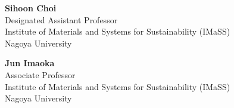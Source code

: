 \begin{titlepage}
\begin{center}
        \vspace{1.2cm} %

        \begin{minipage}[t]{0.45\textwidth}
            \centering
            \footnotesize
            \textbf{Sihoon Choi}\\
            Designated Assistant Professor \\
            Institute of Materials and Systems for Sustainability (IMaSS)\\
            Nagoya University
        \end{minipage}\hfill
        \begin{minipage}[t]{0.45\textwidth}
            \centering
            \footnotesize
            \textbf{Jun Imaoka}\\
            Associate Professor \\
            Institute of Materials and Systems for Sustainability (IMaSS)\\
            Nagoya University
        \end{minipage}

    \end{center}
    \vfill
\end{titlepage}